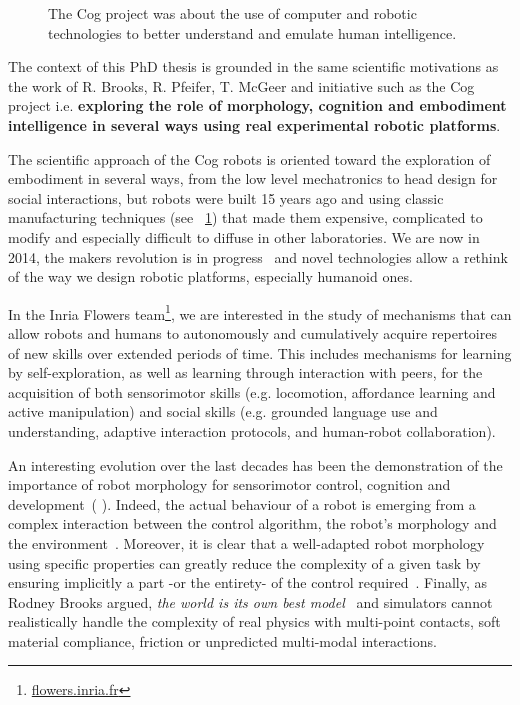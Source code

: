 \begin{figure}[tb]
\centering
    \hfill
    \caption{The Cog project was about the use of computer and robotic technologies to better understand and emulate human intelligence.}
    \label{fig:cog_project}
\end{figure}


The context of this PhD thesis is grounded in the same scientific motivations as the work of R. Brooks, R. Pfeifer, T. McGeer and initiative such as the Cog project i.e. \textbf{exploring the role of morphology, cognition and embodiment intelligence in several ways using real experimental robotic platforms}.

The scientific approach of the Cog robots is oriented toward the exploration of embodiment in several ways, from the low level mechatronics to head design for social interactions, but robots were built 15 years ago and using classic manufacturing techniques (see \figurename~\ref{fig:cog_project}) that made them expensive, complicated to modify and especially difficult to diffuse in other laboratories.
We are now in 2014, the makers revolution is in progress~\parencite{anderson2012makers} and novel technologies allow a rethink of the way we design robotic platforms, especially humanoid ones.


In the Inria Flowers team\footnote{\url{flowers.inria.fr}}, we are interested in the study of mechanisms that can allow robots and humans to autonomously and cumulatively acquire repertoires of new skills over extended periods of time. This includes mechanisms for learning by self-exploration, as well as learning through interaction with peers, for the acquisition of both sensorimotor skills (e.g. locomotion, affordance learning and active manipulation) and social skills (e.g. grounded language use and understanding, adaptive interaction protocols, and human-robot collaboration).

An interesting evolution over the last decades has been the demonstration of the importance of robot morphology for sensorimotor control, cognition and development~(\cite{kaplan2008corps} \cite{steels1995artificial} \cite{Pfeifer06}). Indeed, the actual behaviour of a robot is emerging from a complex interaction between the control algorithm, the robot’s morphology and the environment~\parencite{Steels1991emergence}. Moreover, it is clear that a well-adapted robot morphology using specific properties can greatly reduce the complexity of a given task by ensuring implicitly a part -or the entirety- of the control required~\parencite{pfeifer2005morphological}.
Finally, as Rodney Brooks argued, \emph{the world is its own best model}~\parencite{brooks1991intelligence} and simulators cannot realistically handle the complexity of real physics with multi-point contacts, soft material compliance, friction or unpredicted multi-modal interactions.


